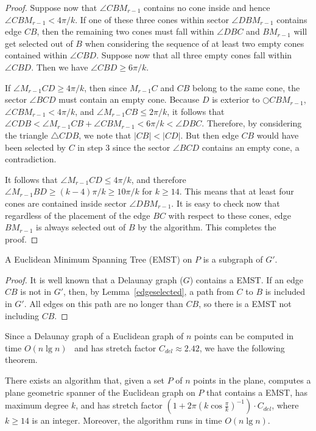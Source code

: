 \documentclass{stacs_proc}
\theoremstyle{plain}\newtheorem{satz}[thm]{Satz}
\begin{document}
\begin{lemma}
\begin{proof}
Suppose now that $\angle{CBM_{r-1}}$ contains no cone inside and
hence $\angle{CBM_{r-1}} < 4 \pi/k$. If one of these three cones
within sector $\angle{DBM_{r-1}}$ contains edge $CB$, then the
remaining two cones must fall within $\angle{DBC}$ and $BM_{r-1}$
will get selected out of $B$ when considering the sequence of at
least two empty cones contained within $\angle{CBD}$. Suppose now
that all three empty cones fall within $\angle{CBD}$. Then we have
$\angle{CBD} \geq 6\pi/k$.

If $\angle{M_{r-1}CD} \geq 4 \pi/k$, then since $M_{r-1}C$ and $CB$
belong to the same cone, the sector $\angle{BCD}$ must contain an
empty cone. Because $D$ is exterior to $\bigcirc{CBM_{r-1}}$,
$\angle{CBM_{r-1}} < 4 \pi/k$, and $\angle{M_{r-1}CB} \leq 2\pi/k$,
it follows that $\angle{CDB} < \angle{M_{r-1}CB} + \angle{CBM_{r-1}}
< 6 \pi /k < \angle{DBC}$. Therefore, by considering the triangle
$\triangle{CDB}$, we note that $|CB| < |CD|$. But then edge $CB$
would have been selected by $C$ in step 3 since the sector
$\angle{BCD}$ contains an empty cone, a contradiction.

It follows that $\angle{M_{r-1}CD} \leq 4 \pi/k$, and therefore
$\angle{M_{r-1}BD} \geq (k-4) \pi/k \geq 10 \pi/k$ for $k \geq 14$.
This means that at least four cones are contained inside sector
$\angle{DBM_{r-1}}$. It is easy to check now that regardless of the
placement of the edge $BC$ with respect to these cones, edge
$BM_{r-1}$ is always selected out of $B$ by the algorithm. This
completes the proof.
\end{proof}
\end{lemma}

\begin{corollary}
A Euclidean Minimum Spanning Tree (EMST) on $P$ is a subgraph of $G'$. 
\begin{proof}
It is well known that a Delaunay graph ($G$) contains a EMST. If an edge $CB$
is not in $G'$, then, by Lemma~\ref{edgeselected}, a path from $C$ to $B$ is
included in $G'$. All edges on this path are no longer than $CB$, so there is
a EMST not including $CB$. 
\end{proof}
\end{corollary}
Since a Delaunay graph of a Euclidean graph of $n$ points can be
computed in time $O(n\lg{n})$~\cite{book} and has stretch factor
$C_{del}\approx 2.42$, we have the following theorem.
\begin{theorem}
\label{spannereuclidean} There exists an algorithm that, given a
set $P$ of $n$ points in the plane, computes a plane geometric spanner
of the Euclidean graph on $P$ that contains a EMST, has maximum degree $k$,
and has stretch factor
$(1+2\pi(k\cos{\frac{\pi}{k}})^{-1}) \cdot C_{del}$, where $k \geq 14$
is an integer. Moreover, the algorithm runs in time $O(n\lg{n})$.
\end{theorem}
\end{document}
